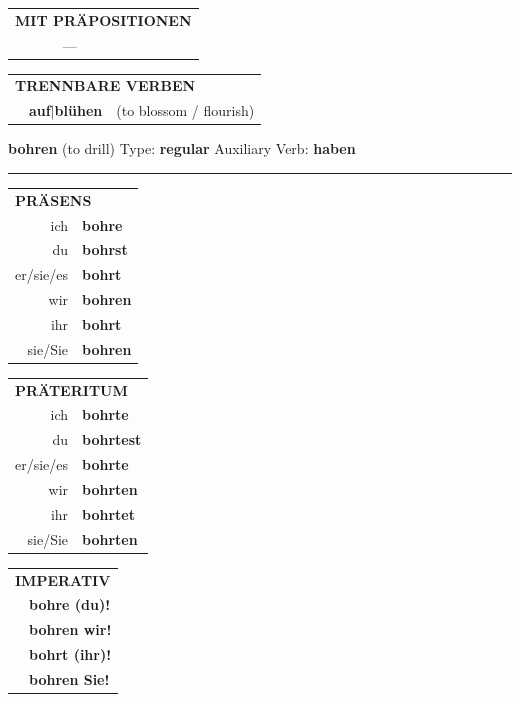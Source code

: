 \documentclass[10pt,a4paper]{revtex4-2}
\begin{document}
\begin{verbbox}
\vspace{10pt}

\begin{tabular}{lll}
\multicolumn{3}{l}{\textbf{MIT PRÄPOSITIONEN}}\\
& ---\\
\end{tabular}
\hfill
\begin{tabular}{lll}
\multicolumn{3}{l}{\textbf{TRENNBARE VERBEN}}\\
& \textbf{auf$|$blühen} & (to blossom / flourish)\\
\end{tabular}
\vspace{-5pt}
\end{verbbox}

\begin{verbbox}
{\Large \bf bohren} (to drill) \hfill Type: \textbf{regular} \hfill Auxiliary Verb: \textbf{haben}

\vspace{5pt}
\hrule
\vspace{5pt}

\begin{tabular}{rl}
\multicolumn{2}{l}{\textbf{PRÄSENS}}\\
ich & \textbf{bohre}\\
du & \textbf{bohrst}\\
er/sie/es & \textbf{bohrt}\\
wir & \textbf{bohren}\\
ihr & \textbf{bohrt}\\
sie/Sie & \textbf{bohren}\\
\end{tabular}
\hfill
\begin{tabular}{rl}
\multicolumn{2}{l}{\textbf{PRÄTERITUM}}\\
ich & \textbf{bohrte}\\
du & \textbf{bohrtest}\\
er/sie/es & \textbf{bohrte}\\
wir & \textbf{bohrten}\\
ihr & \textbf{bohrtet}\\
sie/Sie & \textbf{bohrten}\\
\end{tabular}
\hfill
\begin{tabular}{rl}
\multicolumn{2}{l}{\textbf{IMPERATIV}}\\
& \textbf{bohre (du)!}\\
& \textbf{bohren wir!}\\
& \textbf{bohrt (ihr)!}\\
& \textbf{bohren Sie!}\\
\end{tabular}


\end{verbbox}
\end{document}
